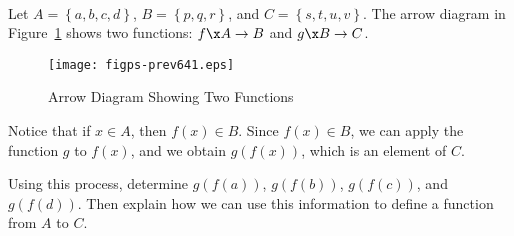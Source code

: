 \begin{previewactivity} \label{PA:compositionintro} \hfill \\
Let  $A = \left\{ {a, b, c, d} \right\}$, $B = \left\{ {p, q, r} \right\}$, and  
$C = \left\{ {s, t, u, v} \right\}$.  The arrow diagram in Figure~\ref{fig:preview64} shows two functions:  
$f\x A \to B$  and  $g\x B \to C$.
\begin{figure}[h]
\begin{center}
\texttt{[image: figps-prev641.eps]} 
\caption{Arrow Diagram Showing Two Functions} \label{fig:preview64}
\end{center}
\end{figure}
Notice that if $x \in A$, then $f(x) \in B$.  Since $f(x) \in B$, we can apply the function $g$ to $f(x)$, and we obtain 
$g(f(x))$, which is an element of $C$.

Using this process, determine $g(f(a))$, $g ( f(b) )$, $g ( f(c) )$, and 
$g ( f(d) )$.  Then explain how we can use this information to define a function from $A$ to $C$.

\end{previewactivity}

\endinput
